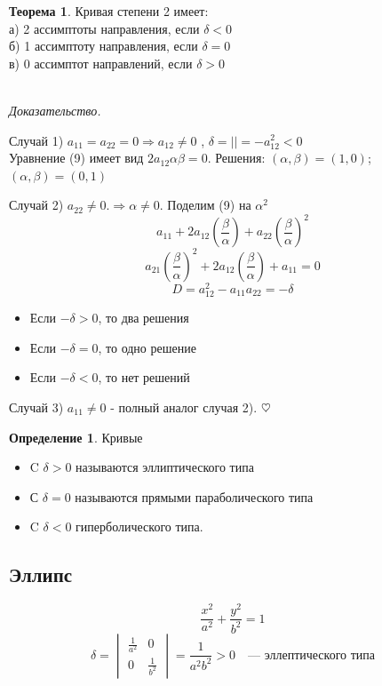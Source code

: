 \documentclass{article}
\theoremstyle{definition}
\newtheorem{definition}{Определение}
\newtheorem{theorem}{Теорема}[section]
\newenvironment{ourproof}{\textit{\\ Доказательство.\\ }}{$\hfill \heartsuit$}
\begin{document}
\begin{theorem}

Кривая степени 2 имеет: 
\\ а) 2 ассимптоты направления, если $\delta < 0$
\\ б) 1 ассимптоту направления, если $\delta = 0$
\\ в) 0 ассимптот направлений, если $\delta > 0$

\begin{ourproof}{}

Случай 1) $a_{11} = a_{22} = 0 \Rightarrow a_{12} \neq 0$ , $\delta = || = -a_{12}^2 < 0$
\\ Уравнение (9) имеет вид $2 a_{12} \alpha \beta = 0.$ Решения: $(\alpha, \beta) = (1,0)$; $(\alpha, \beta) = (0,1)$

Случай 2) $a_{22} \neq 0. \Rightarrow \alpha \neq 0$. Поделим (9) на $\alpha^2$
$$a_{11} + 2 a_{12}\left( \frac{\beta}{\alpha}\right) + a_{22} \left(\frac{\beta}{\alpha}\right)^2$$
$$a_{21} \left(\frac{\beta}{\alpha}\right)^2 + 2 a_{12} \left(\frac{\beta}{\alpha}\right) + a_{11} = 0  $$
$$ D = a_{12}^2 - a_{11} a_{22} = -\delta$$
\begin{itemize}
    \item Если $-\delta > 0$, то два решения
    \item Если $-\delta = 0$, то одно решение
    \item Если $-\delta < 0$, то нет решений
\end{itemize}

Случай 3) $a_{11} \neq 0$ - полный аналог случая 2).
\end{ourproof}
\end{theorem}

\begin{definition} 
Кривые

\begin{itemize}
    \item C $\delta > 0$ называются эллиптического типа \item С $\delta = 0 $ называются прямыми параболического типа \item C $\delta < 0$ гиперболического типа.
\end{itemize}
\end{definition}

\subsection{Эллипс}
$$ \frac{x^2}{a^2} + \frac{y^2}{b^2} = 1 $$
$$\delta = 
\begin{vmatrix}
\frac{1}{a^2} & 0 \\
0 & \frac{1}{b^2}
\end{vmatrix}
= \frac{1}{a^2 b^2} > 0  \quad \textrm{--- эллептического типа}$$
\end{document}
